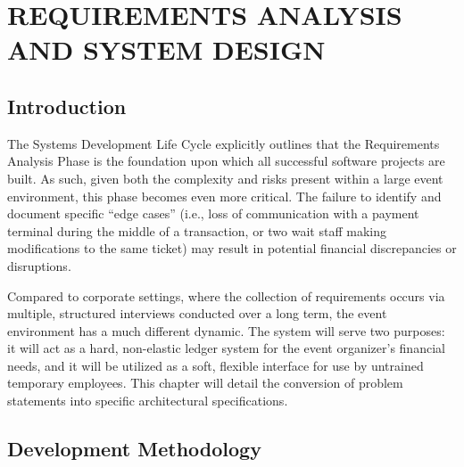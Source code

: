 \chapter{REQUIREMENTS ANALYSIS AND SYSTEM DESIGN}

\section{Introduction}

The Systems Development Life Cycle explicitly outlines that the Requirements Analysis Phase is the foundation upon which all successful software projects are built. As such, given both the complexity and risks present within a large event environment, this phase becomes even more critical. The failure to identify and document specific ``edge cases'' (i.e., loss of communication with a payment terminal during the middle of a transaction, or two wait staff making modifications to the same ticket) may result in potential financial discrepancies or disruptions.

Compared to corporate settings, where the collection of requirements occurs via multiple, structured interviews conducted over a long term, the event environment has a much different dynamic. The system will serve two purposes: it will act as a hard, non-elastic ledger system for the event organizer's financial needs, and it will be utilized as a soft, flexible interface for use by untrained temporary employees. This chapter will detail the conversion of problem statements into specific architectural specifications.

\section{Development Methodology}

